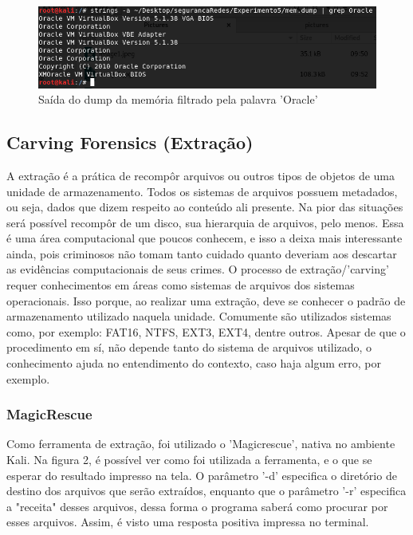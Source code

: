 \documentclass[journal]{IEEEtran}
\begin{document}
\begin{figure}[h!]
	\includegraphics[width=\linewidth]{../pictures/dump_Oracle.png}
	\caption{Saída do dump da memória filtrado pela palavra 'Oracle'}
	\label{fig:memdump_oracle}
\end{figure}

\subsection{Carving Forensics (Extração)}
A extração é a prática de recompôr arquivos ou outros tipos de objetos de uma unidade de armazenamento. Todos os sistemas de arquivos possuem metadados, ou seja, dados que dizem respeito ao conteúdo ali presente. Na pior das situações será possível recompôr de um disco, sua hierarquia de arquivos, pelo menos. Essa é uma área computacional que poucos conhecem, e isso a deixa mais interessante ainda, pois criminosos não tomam tanto cuidado quanto deveriam aos descartar as evidências computacionais de seus crimes.
O processo de extração/'carving' requer conhecimentos em áreas como sistemas de arquivos dos sistemas operacionais. Isso porque, ao realizar uma extração, deve se conhecer o padrão de armazenamento utilizado naquela unidade. Comumente são utilizados sistemas como, por exemplo: FAT16, NTFS, EXT3, EXT4, dentre outros. Apesar de que o procedimento em sí, não depende tanto do sistema de arquivos utilizado, o conhecimento ajuda no entendimento do contexto, caso haja algum erro, por exemplo.\par
\subsubsection{MagicRescue}
Como ferramenta de extração, foi utilizado o 'Magicrescue', nativa no ambiente Kali. Na figura 2, é possível ver como foi utilizada a ferramenta, e o que se esperar do resultado impresso na tela. O parâmetro '-d' especifica o diretório de destino dos arquivos que serão extraídos, enquanto que o parâmetro '-r' especifica a "receita" desses arquivos, dessa forma o programa saberá como procurar por esses arquivos. Assim, é visto uma resposta positiva impressa no terminal.
\end{document}
